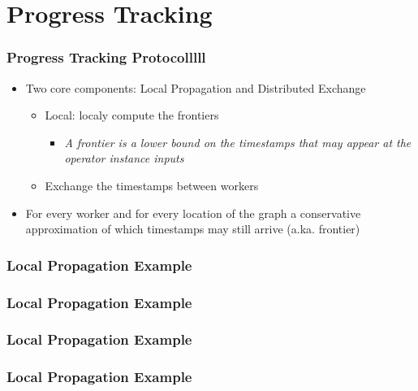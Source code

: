 \documentclass[aspectratio=169,10pt]{beamer}
\begin{document}
\section{Progress Tracking}

\begin{frame}
  \frametitle{Progress Tracking Protocolllll}
  \begin{itemize}
    \item Two core components: Local Propagation and Distributed Exchange
          \begin{itemize}
            \item Local: localy compute the frontiers
                  \begin{itemize}
                    \item \textit{A frontier is a lower bound on the timestamps that may appear at the operator instance inputs}
                  \end{itemize}
            \item Exchange the timestamps between workers
          \end{itemize}
          \pause
    \item For every worker and for every location of the graph a conservative approximation of which timestamps may still arrive (a.ka. frontier)
  \end{itemize}
\end{frame}

\begin{frame}
  \frametitle{Local Propagation Example}
  \begin{center}
    
  \end{center}
\end{frame}

\begin{frame}
  \frametitle{Local Propagation Example}
  \begin{center}
    
  \end{center}
\end{frame}

\begin{frame}
  \frametitle{Local Propagation Example}
  \begin{center}
    
  \end{center}
\end{frame}

\begin{frame}
  \frametitle{Local Propagation Example}
  \begin{center}
    
  \end{center}
\end{frame}
\end{document}
